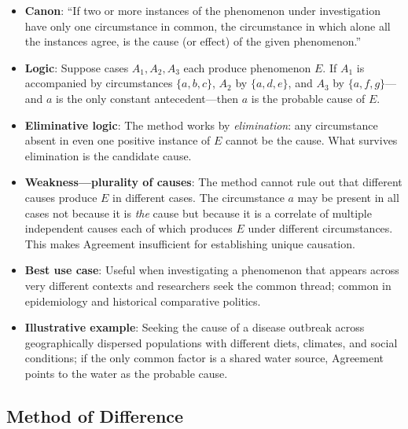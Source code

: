 \documentclass[12pt]{article}
\begin{document}
\begin{itemize}[leftmargin=*, itemsep=4pt]
    \item \textbf{Canon}: ``If two or more instances of the phenomenon under investigation have only one circumstance in common, the circumstance in which alone all the instances agree, is the cause (or effect) of the given phenomenon.''
    \item \textbf{Logic}: Suppose cases $A_1, A_2, A_3$ each produce phenomenon $E$. If $A_1$ is accompanied by circumstances $\{a, b, c\}$, $A_2$ by $\{a, d, e\}$, and $A_3$ by $\{a, f, g\}$---and $a$ is the only constant antecedent---then $a$ is the probable cause of $E$.
    \item \textbf{Eliminative logic}: The method works by \emph{elimination}: any circumstance absent in even one positive instance of $E$ cannot be the cause. What survives elimination is the candidate cause.
    \item \textbf{Weakness---plurality of causes}: The method cannot rule out that different causes produce $E$ in different cases. The circumstance $a$ may be present in all cases not because it is \emph{the} cause but because it is a correlate of multiple independent causes each of which produces $E$ under different circumstances. This makes Agreement insufficient for establishing unique causation.
    \item \textbf{Best use case}: Useful when investigating a phenomenon that appears across very different contexts and researchers seek the common thread; common in epidemiology and historical comparative politics.
    \item \textbf{Illustrative example}: Seeking the cause of a disease outbreak across geographically dispersed populations with different diets, climates, and social conditions; if the only common factor is a shared water source, Agreement points to the water as the probable cause.
\end{itemize}

\subsection{Method of Difference}
\end{document}
